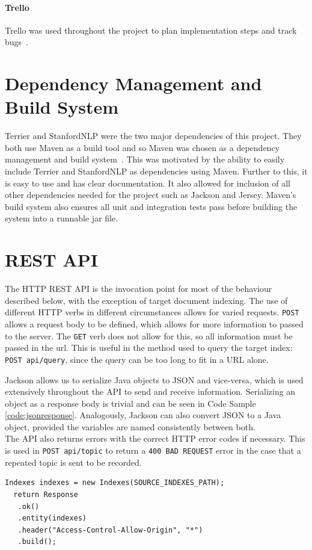 \documentclass{l4proj}
\newcommand{\code}[1]{\texttt{#1}}
\newenvironment{codelisting}{\captionsetup{type=listing}}{}
\begin{document}
\paragraph{Trello}
Trello was used throughout the project to plan implementation steps and track bugs~\cite{trello}.
\section{Dependency Management and Build System}
Terrier and StanfordNLP were the two major dependencies of this project. They both use Maven as a build tool and so Maven was chosen as a dependency management and build system~\cite{maven}. This was motivated by the ability to easily include Terrier and StanfordNLP as dependencies using Maven. Further to this, it is easy to use and has clear documentation. It also allowed for inclusion of all other dependencies needed for the project such as Jackson and Jersey. Maven's build system also ensures all unit and integration tests pass before building the system into a runnable jar file.

\section{REST API}
The HTTP REST API is the invocation point for most of the behaviour described below, with the exception of target document indexing.
The use of different HTTP verbs in different circumstances allows for varied requests. \code{POST} allows a request body to be defined, which allows for more information to passed to the server. The \code{GET} verb does not allow for this, so all information must be passed in the url. This is useful in the method used to query the target index: \code{POST api/query}, since the query can be too long to fit in a URL alone.

Jackson allows us to serialize Java objects to JSON and vice-versa, which is used extensively throughout the API to send and receive information. Serializing an object as a response body is trivial and can be seen in Code Sample \ref{code:jsonresponse}. Analogously, Jackson can also convert JSON to a Java object, provided the variables are named consistently between both.\\
The API also returns errors with the correct HTTP error codes if necessary. This is used in \code{POST api/topic} to return a \code{400 BAD REQUEST} error in the case that a repeated topic is sent to be recorded.
\begin{codelisting}
\begin{verbatim}
Indexes indexes = new Indexes(SOURCE_INDEXES_PATH);
  return Response
   .ok()
   .entity(indexes)
   .header("Access-Control-Allow-Origin", "*")
   .build();
\end{verbatim}
\label{code:jsonresponse}
\end{codelisting}
\end{document}
